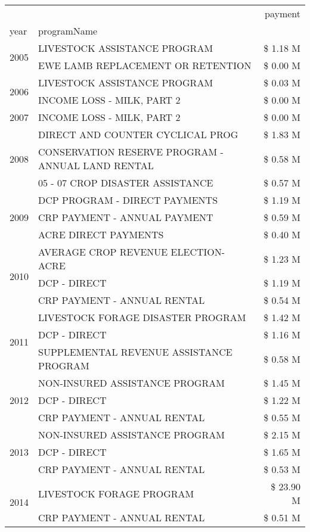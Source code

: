 \begin{tabular}{llr}
\toprule
 &  & payment \\
year & programName &  \\
\midrule
\multirow[t]{2}{*}{2005} & LIVESTOCK ASSISTANCE PROGRAM & \$ 1.18 M \\
 & EWE LAMB REPLACEMENT OR RETENTION & \$ 0.00 M \\
\cline{1-3}
\multirow[t]{2}{*}{2006} & LIVESTOCK ASSISTANCE PROGRAM & \$ 0.03 M \\
 & INCOME LOSS - MILK, PART 2 & \$ 0.00 M \\
\cline{1-3}
2007 & INCOME LOSS - MILK, PART 2 & \$ 0.00 M \\
\cline{1-3}
\multirow[t]{3}{*}{2008} & DIRECT AND COUNTER CYCLICAL PROG & \$ 1.83 M \\
 & CONSERVATION RESERVE PROGRAM - ANNUAL LAND RENTAL & \$ 0.58 M \\
 & 05 - 07 CROP DISASTER ASSISTANCE & \$ 0.57 M \\
\cline{1-3}
\multirow[t]{3}{*}{2009} & DCP PROGRAM - DIRECT PAYMENTS & \$ 1.19 M \\
 & CRP PAYMENT - ANNUAL PAYMENT & \$ 0.59 M \\
 & ACRE DIRECT PAYMENTS & \$ 0.40 M \\
\cline{1-3}
\multirow[t]{3}{*}{2010} & AVERAGE CROP REVENUE ELECTION-ACRE & \$ 1.23 M \\
 & DCP - DIRECT & \$ 1.19 M \\
 & CRP PAYMENT - ANNUAL RENTAL & \$ 0.54 M \\
\cline{1-3}
\multirow[t]{3}{*}{2011} & LIVESTOCK FORAGE DISASTER PROGRAM & \$ 1.42 M \\
 & DCP - DIRECT & \$ 1.16 M \\
 & SUPPLEMENTAL REVENUE ASSISTANCE PROGRAM & \$ 0.58 M \\
\cline{1-3}
\multirow[t]{3}{*}{2012} & NON-INSURED ASSISTANCE PROGRAM & \$ 1.45 M \\
 & DCP - DIRECT & \$ 1.22 M \\
 & CRP PAYMENT - ANNUAL RENTAL & \$ 0.55 M \\
\cline{1-3}
\multirow[t]{3}{*}{2013} & NON-INSURED ASSISTANCE PROGRAM & \$ 2.15 M \\
 & DCP - DIRECT & \$ 1.65 M \\
 & CRP PAYMENT - ANNUAL RENTAL & \$ 0.53 M \\
\cline{1-3}
\multirow[t]{3}{*}{2014} & LIVESTOCK FORAGE PROGRAM & \$ 23.90 M \\
 & CRP PAYMENT - ANNUAL RENTAL & \$ 0.51 M \\

\end{tabular}
